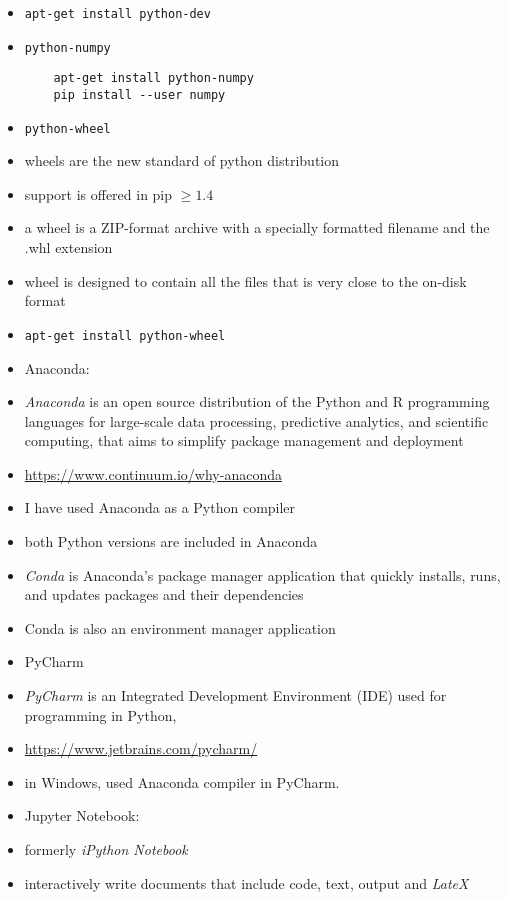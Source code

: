 \documentclass[twocolumn]{IEEEtran} %
\begin{document}
\begin{itemize}
        \item \verb|apt-get install python-dev|
    \ei
    \item \verb|python-numpy|
\begin{verbatim}
    apt-get install python-numpy
    pip install --user numpy
\end{verbatim}
    \item \verb|python-wheel|
    \bi
        \item wheels are the new standard of python distribution
        \item support is offered in pip $\geq 1.4$
        \item a wheel is a ZIP-format archive with a specially formatted filename and the .whl extension
        \item wheel is designed to contain all the files that is very close to the on-disk format
        \item \verb|apt-get install python-wheel|
    \ei
    \item Anaconda:
    \bi
        \item \emph{Anaconda} is an open source distribution of the Python and R programming languages for large-scale data processing, predictive analytics, and scientific computing, that aims to simplify package management and deployment
        \item \url{https://www.continuum.io/why-anaconda}
        \item I have used Anaconda as a Python compiler
        \item both Python versions are included in Anaconda
        \item \emph{Conda} is Anaconda's package manager application that quickly installs, runs, and updates packages and their dependencies
        \bi
            \item Conda is also an environment manager application
        \ei
    \ei
    \item PyCharm
    \bi
        \item \emph{PyCharm} is an Integrated Development Environment (IDE) used for programming in Python,
        \item \url{https://www.jetbrains.com/pycharm/}
        \item in Windows, used Anaconda compiler in PyCharm.
    \ei
    \item Jupyter Notebook:
    \bi
        \item formerly \emph{iPython Notebook}
        \item interactively write documents that include code, text, output and \emph{LateX}

\end{itemize}
\end{document}
